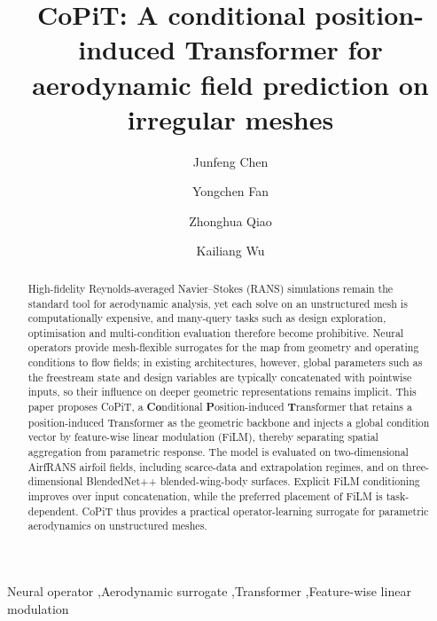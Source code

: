 \documentclass[final,3p,times]{elsarticle}
\begin{document}
\begin{frontmatter}

\title{CoPiT: A conditional position-induced Transformer for aerodynamic field prediction on irregular meshes}

\author[hkust]{Junfeng Chen}
\author[polyu]{Yongchen Fan}%
\author[polyu]{Zhonghua Qiao}
\author[sustech]{Kailiang Wu}

\address[polyu]{Department of Applied Mathematics, The Hong Kong Polytechnic University, Hung Hom, Kowloon, Hong Kong, China}
\address[hkust]{Department of Mathematics, The Hong Kong University of Science and Technology, Clear Water Bay, Kowloon, Hong Kong, China}
\address[sustech]{Department of Mathematics, Southern University of Science and Technology, Shenzhen 518055, China}

\begin{abstract}
High-fidelity Reynolds-averaged Navier--Stokes (RANS) simulations remain the standard tool for aerodynamic analysis, yet each solve on an unstructured mesh is computationally expensive, and many-query tasks such as design exploration, optimisation and multi-condition evaluation therefore become prohibitive. Neural operators provide mesh-flexible surrogates for the map from geometry and operating conditions to flow fields; in existing architectures, however, global parameters such as the freestream state and design variables are typically concatenated with pointwise inputs, so their influence on deeper geometric representations remains implicit. This paper proposes CoPiT, a \textbf{Co}nditional \textbf{P}osition-induced \textbf{T}ransformer that retains a position-induced Transformer as the geometric backbone and injects a global condition vector by feature-wise linear modulation (FiLM), thereby separating spatial aggregation from parametric response. The model is evaluated on two-dimensional AirfRANS airfoil fields, including scarce-data and extrapolation regimes, and on three-dimensional BlendedNet++ blended-wing-body surfaces. Explicit FiLM conditioning improves over input concatenation, while the preferred placement of FiLM is task-dependent. CoPiT thus provides a practical operator-learning surrogate for parametric aerodynamics on unstructured meshes.
\end{abstract}

\begin{keyword}
Neural operator \sep Aerodynamic surrogate \sep Transformer \sep Feature-wise linear modulation
\end{keyword}

\end{frontmatter}
\end{document}
